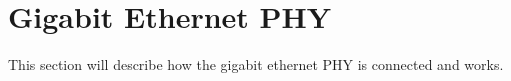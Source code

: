\section{Gigabit Ethernet PHY} %
\label{sec:gige}
    This section will describe how the gigabit ethernet PHY is connected and works.
